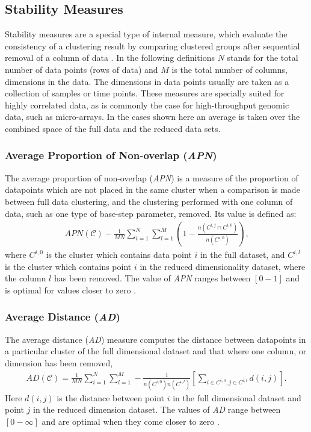 \subsection{Stability Measures}
Stability  measures are  a  special type  of  internal measure,  which
evaluate the consistency of a clustering result by comparing clustered
groups after sequential removal  of a column of data \cite{datta2003}.
In the following  definitions $N$ stands for the  total number of data
points  (rows  of  data) and  $M$  is  the  total number  of  columns,
dimensions in  the data.   The dimensions in  data points  usually are
taken as a  collection of samples or time  points.  These measures are
specially suited for  highly correlated data, as is  commonly the case
for high-throughput genomic data,  such as micro-arrays.  In the cases
shown here  an average is  taken over the  combined space of  the full
data and the reduced data sets.

\subsubsection{Average Proportion of Non-overlap (\textit{APN})}
The average  proportion of non-overlap (\textit{APN}) is  a measure of
the proportion of datapoints which  are not placed in the same cluster
when  a comparison  is  made  between full  data  clustering, and  the
clustering  performed with one  column of  data, such  as one  type of
base-step parameter, removed. Its value is defined as:
\begin{gather}
\textit{APN}(\mathcal{C}) - \frac{1}{MN} \sum_{i=1}^{N}\sum_{l=1}^{M} \left( 1
- \frac{n(C^{i,j} \cap C^{i,0})}{n(C^{i,0})} \right) \text{,}
\end{gather}  
where $C^{i,0}$ is the cluster which contains data point $i$ in the
full dataset, and $C^{i,l}$ is the cluster which contains point $i$ in
the  reduced dimensionality  dataset, where  the column  $l$  has been
removed.  The  value of \textit{APN} ranges between $[0-1]$  and is optimal
for values closer to zero \cite{datta2003, brock2008}.

\subsubsection{Average Distance (\textit{AD})}
The  average  distance  (\textit{AD})  measure computes  the  distance
between  datapoints in a  particular cluster  of the  full dimensional
dataset and that where one column, or dimension has been removed,
\begin{gather}
AD(\mathcal{C})=\frac{1}{MN}       \sum_{i=1}^{N}\sum_{l=1}^{M}      -
\frac{1}{n(C^{i,0})n(C^{i,l})}  \left[  \sum_{i  \in  C^{i,0},  j  \in
    C^{i,l}} d(i,j) \right] \text{.}
\end{gather}
Here  $d(i,j)$  is  the  distance   between  point  $i$  in  the  full
dimensional dataset  and point $j$  in the reduced  dimension dataset.
The values  of \textit{AD} range between $[0-\infty]$  and are optimal
when they come closer to zero \cite{datta2003, brock2008}.

